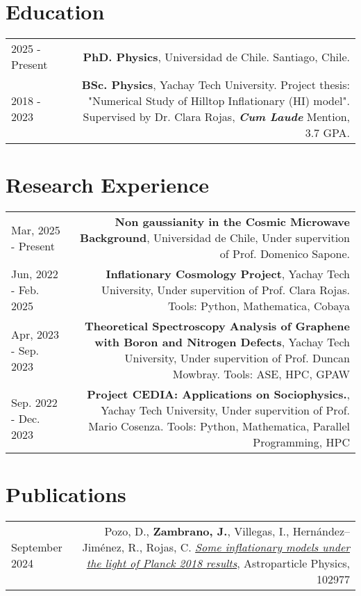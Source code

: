 \documentclass{article}
\begin{document}
\section*{Education}
\begin{tabular}{L!{\vrule}R}
	2025 - Present & \textbf{PhD. Physics}, Universidad de Chile. Santiago, Chile. \\
  2018 - 2023 & \textbf{BSc. Physics}, Yachay Tech University. Project thesis: "Numerical Study of Hilltop Inflationary (HI) model". Supervised by Dr. Clara Rojas, \textbf{\textit{Cum Laude}} Mention, 3.7 GPA. \\
  
\end{tabular}

\section*{Research Experience}

\begin{tabular}{L!{\vrule}R}
    Mar, 2025 - Present & \textbf{Non gaussianity in the Cosmic Microwave Background}, Universidad de Chile, Under supervition of Prof. Domenico Sapone. \\
    Jun, 2022 - Feb. 2025  & \textbf{Inflationary Cosmology Project}, Yachay Tech University, Under supervition of Prof. Clara Rojas. Tools: Python, Mathematica, Cobaya \\
    Apr, 2023 - Sep. 2023  & \textbf{Theoretical Spectroscopy Analysis of Graphene with Boron and Nitrogen Defects}, Yachay Tech University, Under supervition of Prof. Duncan Mowbray. Tools: ASE, HPC, GPAW \\
    Sep. 2022 - Dec. 2023  & \textbf{Project CEDIA: Applications on Sociophysics.}, Yachay Tech University, Under supervition of Prof. Mario Cosenza. Tools: Python, Mathematica, Parallel Programming, HPC \\
    
\end{tabular}


\section*{Publications}

\begin{tabular}{L!{\vrule}R}
    September 2024 & 
    Pozo, D., \textbf{Zambrano, J.}, Villegas, I., Hernández–Jiménez, R., Rojas, C.
    \href{https://ui.adsabs.harvard.edu/abs/2024APh...16102977P/}{\textit{Some inflationary models under the light of Planck 2018 results}},
    Astroparticle Physics, 102977 \\
\end{tabular}
\end{document}

